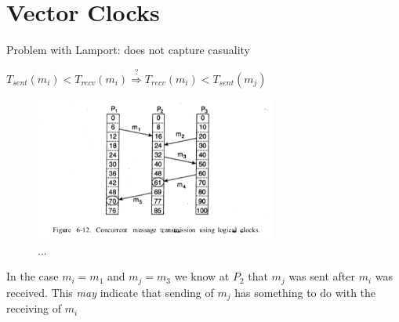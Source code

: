 \documentclass[ngerman,a4paper]{report}
\begin{document}
\section{Vector Clocks}
\begin{compactitem}
	\item Problem with Lamport: does not capture casuality
	\item $T_{sent}(m_i) < T_{recv} (m_i) \overset{?}{\Rightarrow} T_{recv} (m_i) < T_{sent} (m_j)$ 
	

\begin{figure}[h]
	\centering
	\includegraphics[width=300px]{gfx/lamport-concurrent.png}
	\caption{...}
	\label{img:lamport-concurrent}
\end{figure}

	\item 
		In the case $m_i=m_1$ and $m_j = m_3$ we know at $P_2$  that $m_j$ was sent after $m_i$ was received. This \emph{may} indicate that sending of $m_j$ has something to do with the receiving of $m_i$ 


\end{compactitem}
\end{document}
